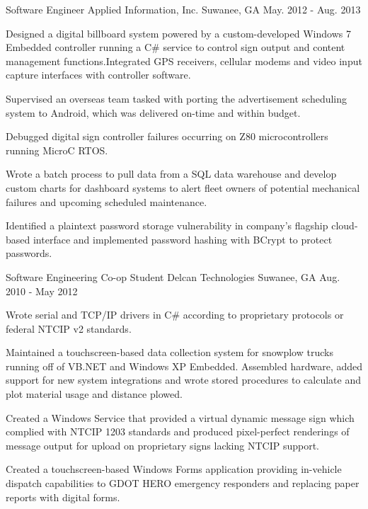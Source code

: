 \begin{cventries}
  \cventry
    {Software Engineer} %
    {Applied Information, Inc.} %
    {Suwanee, GA} %
    {May. 2012 - Aug. 2013} %
    {
      \begin{cvitems} %
        \item {Designed a digital billboard system powered by a custom-developed Windows 7 Embedded controller running a C\# service to control sign output and content management functions.Integrated GPS receivers, cellular modems and video input capture interfaces with controller software.}
        \item {Supervised an overseas team tasked with porting the advertisement scheduling system to Android, which was delivered on-time and within budget.}
        \item {Debugged digital sign controller failures occurring on Z80 microcontrollers running MicroC RTOS.}
        \item {Wrote a batch process to pull data from a SQL data warehouse and develop custom charts for dashboard systems to alert fleet owners of potential mechanical failures and upcoming scheduled maintenance.}
        \item {Identified a plaintext password storage vulnerability in company's flagship cloud-based interface and implemented password hashing with BCrypt to protect passwords.}
      \end{cvitems}
    }

  \cventry
    {Software Engineering Co-op Student} %
    {Delcan Technologies} %
    {Suwanee, GA} %
    {Aug. 2010 - May 2012} %
    {
      \begin{cvitems} %
        \item {Wrote serial and TCP/IP drivers in C\# according to proprietary protocols or federal NTCIP v2 standards.}
        \item {Maintained a touchscreen-based data collection system for snowplow trucks running off of VB.NET and Windows XP Embedded. Assembled hardware, added support for new system integrations and wrote stored procedures to calculate and plot material usage and distance plowed.}
        \item {Created a Windows Service that provided a virtual dynamic message sign which complied with NTCIP 1203 standards and produced pixel-perfect renderings of message output for upload on proprietary signs lacking NTCIP support.}
        \item {Created a touchscreen-based Windows Forms application providing in-vehicle dispatch capabilities to GDOT HERO emergency responders and replacing paper reports with digital forms.}
      \end{cvitems}
    }
\end{cventries}
